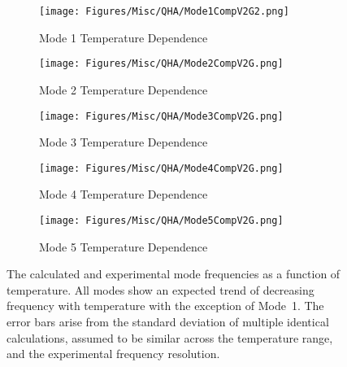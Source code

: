 \begin{figure}
\centering

\begin{subfigure}{0.45\textwidth}
\centering
\texttt{[image: Figures/Misc/QHA/Mode1CompV2G2.png]}
\caption{Mode 1 Temperature Dependence}
\label{fig:mode1temp}
\end{subfigure}
\begin{subfigure}{0.45\textwidth}
\centering
\texttt{[image: Figures/Misc/QHA/Mode2CompV2G.png]}
\caption{Mode 2 Temperature Dependence}
\label{fig:mode2temp}
\end{subfigure}

\begin{subfigure}{0.45\textwidth}
\centering
\texttt{[image: Figures/Misc/QHA/Mode3CompV2G.png]}
\caption{Mode 3 Temperature Dependence}
\label{fig:mode3temp}
\end{subfigure}
\begin{subfigure}{0.45\textwidth}
\centering
\texttt{[image: Figures/Misc/QHA/Mode4CompV2G.png]}
\caption{Mode 4 Temperature Dependence}
\label{fig:mode4temp}
\end{subfigure}

\begin{subfigure}{0.45\textwidth}
\centering
\texttt{[image: Figures/Misc/QHA/Mode5CompV2G.png]}
\caption{Mode 5 Temperature Dependence}
\label{fig:mode5temp}
\end{subfigure}
\captionsetup{font = footnotesize, justification = centering}
\caption[The Calculated and Experimental Mode Frequencies as a Function of Temperature]{The calculated and experimental mode frequencies as a function of temperature. All modes show an expected trend of decreasing frequency with temperature with the exception of Mode~1. The error bars arise from the standard deviation of multiple identical calculations, assumed to be similar across the temperature range, and the experimental frequency resolution. \DIFdelbeginFL {}\DIFdelendFL }
\label{Fig:ModeTempShift}
\end{figure}

